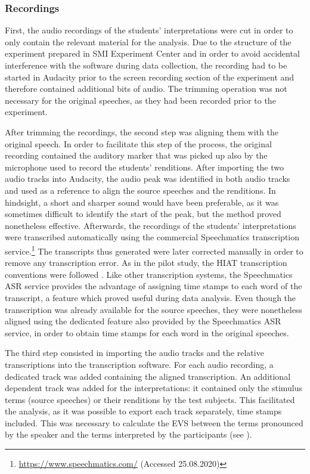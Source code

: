 \subsubsection{Recordings} \label{recordings}
First, the audio recordings of the students' interpretations were cut in order to only contain the relevant material for the analysis. Due to the structure of the experiment prepared in SMI Experiment Center and in order to avoid accidental interference with the software during data collection, the recording had to be started in Audacity prior to the screen recording section of the experiment and therefore contained additional bits of audio. The trimming operation was not necessary for the original speeches, as they had been recorded prior to the experiment.

After trimming the recordings, the second step was aligning them with the original speech. In order to facilitate this step of the process, the original recording contained the auditory marker that was picked up also by the microphone used to record the students' renditions. After importing the two audio tracks into Audacity, the audio peak was identified in both audio tracks and used as a reference to align the source speeches and the renditions. In hindsight, a short and sharper sound would have been preferable, as it was sometimes difficult to identify the start of the peak, but the method proved nonetheless effective. Afterwards, the recordings of the students' interpretations were transcribed automatically using the commercial Speechmatics transcription service.\footnote{\url{https://www.speechmatics.com/} (Accessed 25.08.2020)} The transcripts thus generated were later corrected manually in order to remove any transcription error. As in the pilot study, the HIAT transcription conventions were followed \citep{HIAT}. Like other transcription systems, the Speechmatics ASR service provides the advantage of assigning time stamps to each word of the transcript, a feature which proved useful during data analysis. Even though the transcription was already available for the source speeches, they were nonetheless aligned using the dedicated feature also provided by the Speechmatics ASR service, in order to obtain time stamps for each word in the original speeches.

The third step consisted in importing the audio tracks and the relative transcriptions into the \citet{ELAN} transcription software. For each audio recording, a dedicated track was added containing the aligned transcription. An additional dependent track was added for the interpretations: it contained only the stimulus terms (source speeches) or their renditions by the test subjects. This facilitated the analysis, as it was possible to export each track separately, time stamps included. This was necessary to calculate the EVS between the terms pronounced by the speaker and the terms interpreted by the participants (see ).

